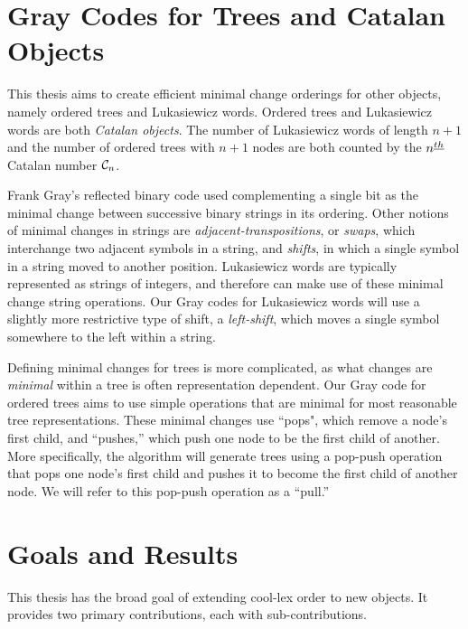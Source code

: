 \section{Gray Codes for Trees and Catalan Objects} \label{sec:intro_Graycodes}

This thesis aims to create efficient minimal change orderings for other objects, namely ordered trees and Lukasiewicz words.  Ordered trees and Lukasiewicz words are both \emph{Catalan objects}.  The number of Lukasiewicz words of length $n+1$ and the number of ordered trees with $n+1$ nodes are both counted by the $n^{\underline{th}}$ Catalan number $\mathcal{C}_n$.  

Frank Gray's reflected binary code used complementing a single bit as the minimal change between successive binary strings in its ordering.  Other notions of minimal changes in strings are \emph{adjacent-transpositions}, or \emph{swaps}, which interchange two adjacent symbols in a string, and \emph{shifts}, in which a single symbol in a string moved to another position. Lukasiewicz words are typically represented as strings of integers, and therefore can make use of these minimal change string operations.  Our Gray codes for Lukasiewicz words will use a slightly more restrictive type of shift, a \emph{left-shift}, which moves a single symbol somewhere to the left within a string. 




Defining minimal changes for trees is more complicated, as what changes are \emph{minimal} within a tree is often representation dependent.  Our Gray code for ordered trees aims to use simple operations that are minimal for most reasonable tree representations.  These minimal changes use ``pops", which remove a node's first child, and ``pushes,'' which push one node to be the first child of another.  More specifically, the algorithm will generate trees using a pop-push operation that pops one node's first child and pushes it to become the first child of another node.  We will refer to this pop-push operation as a ``pull.''




\section{Goals and Results}


This thesis has the broad goal of extending cool-lex order to new objects.  It provides two primary contributions, each with sub-contributions.  

